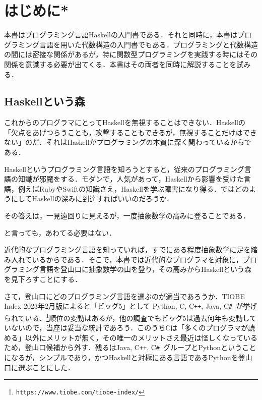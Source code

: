 \documentclass[a5paper,twoside,fleqn,draft]{jsbook}
\newcommand{\textURL}[1]{\texttt{#1}}
\newcommand{\programminglanguage}[1]{\textsf{#1}}
\newcommand{\clang}{\programminglanguage{C}}
\newcommand{\csharp}{\programminglanguage{C}\texttt{\#}}
\newcommand{\cxx}{\programminglanguage{C}\texttt{++}}
\newcommand{\haskell}{\programminglanguage{Haskell}}
\newcommand{\java}{\programminglanguage{Java}}
\newcommand{\python}{\programminglanguage{Python}}
\newcommand{\ruby}{\programminglanguage{Ruby}}
\newcommand{\swift}{\programminglanguage{Swift}}
\newenvironment{leader}{\begingroup\gt}{\endgroup}
\begin{document}
\chapter{はじめに*}
\label{ch:introduction}

\begin{leader}
本書はプログラミング言語\haskell の入門書である．それと同時に，本書はプログラミング言語を用いた代数構造の入門書でもある．プログラミングと代数構造の間には密接な関係があるが，特に関数型プログラミングを実践する時にはその関係を意識する必要が出てくる．本書はその両者を同時に解説することを試みる．
\end{leader}

\section{\haskell という森}

これからのプログラマにとって\haskell を無視することはできない．\haskell の「欠点をあげつらうことも，攻撃することもできるが，無視することだけはできない」のだ．それは\haskell がプログラミングの本質に深く関わっているからである．

\haskell というプログラミング言語を知ろうとすると，従来のプログラミング言語の知識が邪魔をする．モダンで，人気があって，\haskell から影響を受けた言語，例えば\ruby や\swift の知識さえ，\haskell を学ぶ障害になり得る．ではどのようにして\haskell の深みに到達すればいいのだろうか．

その答えは，一見遠回りに見えるが，一度抽象数学の高みに登ることである．

と言っても，あわてる必要はない．

近代的なプログラミング言語を知っていれば，すでにある程度抽象数学に足を踏み入れているからである．そこで，本書では近代的なプログラマを対象に，プログラミング言語を登山口に抽象数学の山を登り，その高みから\haskell という森を見下ろすことにする．


さて，登山口にどのプログラミング言語を選ぶのが適当であろうか．TIOBE Index 2023年2月版によると「ビッグ5」として \python, \clang, \cxx, \java, \csharp\ が挙げられている．\footnote{\textURL{https://www.tiobe.com/tiobe-index/}}順位の変動はあるが，他の調査でもビッグ5は過去何年も変動していないので，当座は妥当な統計であろう．このうち\clang は「多くのプログラマが読める」以外にメリットが無く，その唯一のメリットさえ最近は怪しくなっているため，登山口候補から外す．残るは\java, \cxx, \csharp\ グループと\python ということになるが，シンプルであり，かつ\haskell と対極にある言語である\python を登山口に選ぶことにした．
\end{document}
